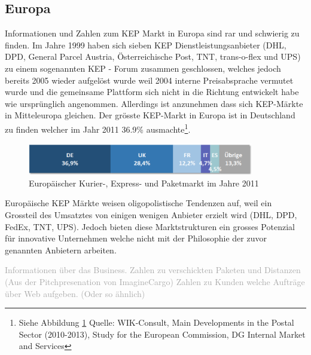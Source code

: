 \subsection{Europa}
Informationen und Zahlen zum KEP Markt in Europa sind rar und schwierig zu finden. Im Jahre 1999 haben sich sieben KEP Dienstleistungsanbieter (DHL, DPD, General Parcel Austria, Österreichische Post,
TNT, trans-o-flex und UPS) zu einem sogenannten KEP - Forum zusammen geschlossen, welches jedoch bereits 2005 wieder aufgelöst wurde weil 2004 interne Preisabsprache vermutet wurde und die gemeinsame Plattform sich nicht in die Richtung entwickelt habe wie ursprünglich angenommen\citep[S. 14]{mencler2006KEP}. Allerdings ist anzunehmen dass sich KEP-Märkte in Mitteleuropa gleichen. Der grösste KEP-Markt in Europa ist in Deutschland zu finden welcher im Jahr 2011 36.9\% ausmachte\footnote{Siehe Abbildung \ref{fig1:marktanteil} Quelle: WIK-Consult, Main Developments in the Postal Sector (2010-2013), Study for the European Commission, DG Internal Market and Services}.
\begin{figure}[ht]
	\centering
  \includegraphics[width=0.88\textwidth]{images/kepMarktEuropa2011.png}
	\caption{Europäischer Kurier-, Express- und Paketmarkt im Jahre 2011} %
	\label{fig1:marktanteil}
\end{figure}
Europäische KEP Märkte weisen oligopolistische Tendenzen auf, weil ein Grossteil des Umsatztes von einigen wenigen Anbieter erzielt wird (DHL, DPD, FedEx, TNT, UPS)\citep[S.14]{baum2004produktivitäts}. Jedoch bieten diese Marktstrukturen ein grosses Potenzial für innovative Unternehmen welche nicht mit der Philosophie der zuvor genannten Anbietern arbeiten.

\textcolor{darkgray}{
  Informationen über das Business.
  Zahlen zu verschickten Paketen und Distanzen (Aus der Pitchpresenation von ImagineCargo)
  Zahlen zu Kunden welche Aufträge über Web aufgeben. (Oder so ähnlich)
}


